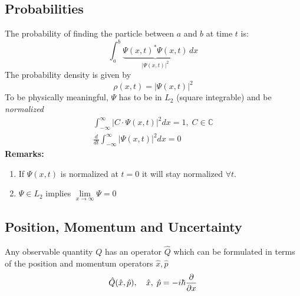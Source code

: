\subsection{Probabilities}
The probability of finding the particle between $a$ and $b$ at time $t$ is:
\begin{equation*}
    \int_a^b \underbrace{{\Psi(x,t)}^*\Psi(x,t)}_{|\Psi(x,t)|^2}\,dx
\end{equation*}
The probability density is given by
\begin{equation*}
    \rho(x,t) = |\Psi(x,t)|^2
\end{equation*}
To be physically meaningful, $\Psi$ has to be in $L_2$ (square integrable) and be \textit{normalized}
\begin{align*}
    \int_{-\infty}^{\infty} |C\cdot \Psi(x,t)|^2 dx = 1, \; C\in\mathbb{C} \\
    \frac{d}{dt}\int_{-\infty}^{\infty} |\Psi(x,t)|^2 dx = 0
\end{align*}
\textbf{Remarks:}
\begin{enumerate}
    \item If $\Psi(x,t)$ is normalized at $t=0$ it will stay normalized $\forall t$.
    \item $\Psi \in L_2$ implies $\lim \limits_{x \to \infty}\Psi=0$
\end{enumerate}


\subsection{Position, Momentum and Uncertainty}
Any observable quantity $Q$ has an operator $\hat{Q}$ which can be formulated in terms of the position and momentum operators $\hat{x}, \hat{p}$
\begin{equation*}
    \hat{Q}(\hat{x},\hat{p}), \hspace*{10pt} \hat{x},\; \hat{p}=-i\hbar \frac{\partial}{\partial x}
\end{equation*}


